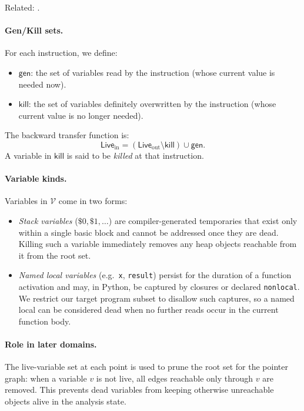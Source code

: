 Related: \cite{pythonsemantics}.

\paragraph{Gen/Kill sets.}
For each instruction, we define:
\begin{itemize}
    \item $\mathsf{gen}$: the set of variables read by the instruction (whose current value is needed now).
    \item $\mathsf{kill}$: the set of variables definitely overwritten by the instruction (whose current value is no longer needed).
\end{itemize}
The backward transfer function is:
\[
\mathsf{Live}_{\mathrm{in}} = (\mathsf{Live}_{\mathrm{out}} \setminus \mathsf{kill}) \cup \mathsf{gen}.
\]
A variable in $\mathsf{kill}$ is said to be \emph{killed} at that instruction.

\paragraph{Variable kinds.}
Variables in $\mathcal{V}$ come in two forms:
\begin{itemize}
    \item \emph{Stack variables} ($\$0, \$1, \ldots$) are compiler-generated temporaries that exist only within a single basic block and cannot be addressed once they are dead.  
          Killing such a variable immediately removes any heap objects reachable from it from the root set.
    \item \emph{Named local variables} (e.g.\ \texttt{x}, \texttt{result}) persist for the duration of a function activation and may, in Python, be captured by closures or declared \texttt{nonlocal}.
          We restrict our target program subset to disallow such captures, so a named local can be considered dead when no further reads occur in the current function body.
\end{itemize}

\paragraph{Role in later domains.}
The live-variable set at each point is used to prune the root set for the pointer graph: when a variable $v$ is not live, all edges reachable only through $v$ are removed.
This prevents dead variables from keeping otherwise unreachable objects alive in the analysis state.

